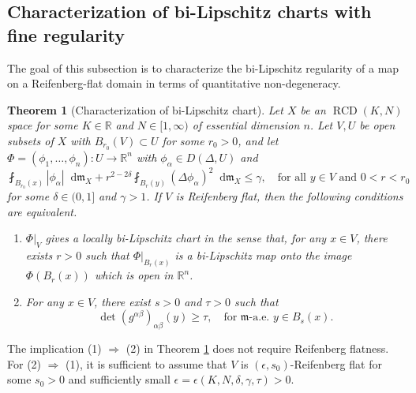 \documentclass[11pt,reqno]{amsart}
\newtheorem{theorem}{Theorem}[section]
\theoremstyle{definition}
\numberwithin{equation}{section}
\newcommand{\di}{\mathop{}\!\mathrm{d}}
\newcommand{\meas}{\mathfrak{m}}
\DeclareMathOperator{\RCD}{RCD}
\begin{document}
\subsection{Characterization of bi-Lipschitz charts with fine regularity}
The goal of this subsection is to characterize the bi-Lipschitz regularity of a map on a Reifenberg-flat domain in terms of quantitative non-degeneracy.
\begin{theorem}[Characterization of bi-Lipschitz chart]\label{bilipchara}
Let $X$ be an $\RCD(K, N)$ space for some $K \in \mathbb{R}$ and $N \in [1, \infty)$ of essential dimension $n$. Let $V, U$ be open subsets of $X$ with $B_{r_0}(V) \subset U$ for some $r_0>0$, 
and let $\Phi=(\phi_1, \ldots, \phi_n):U \to \mathbb{R}^n$ with
$\phi_{\alpha} \in D(\Delta, U)$ and
    \begin{equation}
        \fint_{B_{r_0}(x)}|\phi_{\alpha}|\di \meas_X+r^{2-2\delta}\fint_{B_r(y)}(\Delta \phi_{\alpha})^2\di \meas_X \le \gamma,\quad \text{for all $y \in V$ and $0<r<r_0$}
    \end{equation}
    for some $\delta \in (0,1]$ and $\gamma>1$. 
If $V$ is Reifenberg flat, 
 then the following conditions are equivalent.
\begin{enumerate}
\item $\Phi|_V$ gives a locally bi-Lipschitz chart in the sense that, for any $x \in V$, there exists $r>0$ such that $\Phi|_{B_r(x)}$ is a bi-Lipschitz map onto the image $\Phi(B_r(x))$ which is open in $\mathbb{R}^n$.
\item For any $x \in V$, there exist $s>0$ and $\tau>0$ such that 
\begin{equation}\label{lowertau}
\det(g^{\alpha \beta})_{\alpha \beta} (y) \ge \tau,\quad \text{for $\meas$-a.e. $y \in B_s(x)$.} 
\end{equation}
\end{enumerate}
\end{theorem}
      The implication (1) $\Rightarrow$ (2) in Theorem \ref{bilipchara} does not require  Reifenberg flatness. For (2) $\Rightarrow$ (1), it is sufficient to assume that $V$ is $(\epsilon, s_0)$-Reifenberg flat for some $s_0>0$ and sufficiently small $\epsilon = \epsilon (K, N, \delta, \gamma, \tau) > 0$.
\end{document}

